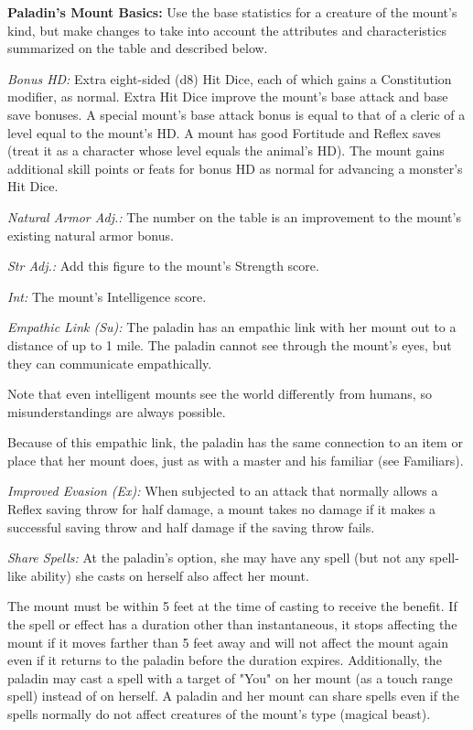 \textbf{Paladin's Mount Basics:} Use the base statistics for a creature of the 
mount's kind, but make changes to take into account the attributes and 
characteristics summarized on the table and described below.

\textit{Bonus HD:} Extra eight-sided (d8) Hit Dice, each of which gains a Constitution 
modifier, as normal. Extra Hit Dice improve the mount's base attack and base save 
bonuses. A special mount's base attack bonus is equal to that of a cleric of a 
level equal to the mount's HD. A mount has good Fortitude and Reflex saves (treat 
it as a character whose level equals the animal's HD). The mount gains additional 
skill points or feats for bonus HD as normal for advancing a monster's Hit Dice.

\textit{Natural Armor Adj.:} The number on the table is an improvement to the mount's 
existing natural armor bonus.

\textit{Str Adj.:} Add this figure to the mount's Strength score.

\textit{Int:} The mount's Intelligence score.

\textit{Empathic Link (Su):} The paladin has an empathic link with her mount out 
to a distance of up to 1 mile. The paladin cannot see through the mount's eyes, 
but they can communicate empathically.

Note that even intelligent mounts see the world differently from humans, so misunderstandings 
are always possible.

Because of this empathic link, the paladin has the same connection to an item or 
place that her mount does, just as with a master and his familiar (see Familiars).

\textit{Improved Evasion (Ex):} When subjected to an attack that normally allows 
a Reflex saving throw for half damage, a mount takes no damage if it makes a successful 
saving throw and half damage if the saving throw fails.

\textit{Share Spells:} At the paladin's option, she may have any spell (but not 
any spell-like ability) she casts on herself also affect her mount. 

The mount must be within 5 feet at the time of casting to receive the benefit. 
If the spell or effect has a duration other than instantaneous, it stops affecting 
the mount if it moves farther than 5 feet away and will not affect the mount again 
even if it returns to the paladin before the duration expires. Additionally, the 
paladin may cast a spell with a target of "You" on her mount (as a touch range 
spell) instead of on herself. A paladin and her mount can share spells even if 
the spells normally do not affect creatures of the mount's type (magical beast).

